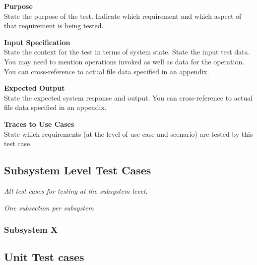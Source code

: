 \documentclass[12pt]{article}
\newcounter{req ID}
\begin{document}
\noindent
{\bf Purpose}\\
State the purpose of the test.
Indicate which requirement and which aspect of that requirement is being tested.

\noindent
{\bf Input Specification}\\
State the context for the test in terms of system state.
State the input test data. You may need to mention operations invoked as well as data for the operation.
You can cross-reference to actual file data specified in an appendix.

\noindent
{\bf Expected Output}\\
State the expected system response and output.
You can cross-reference to actual file data specified in an appendix.

\noindent
{\bf Traces to Use Cases}\\
State which requirements (at the level of use case and scenario) are tested by this test case.

\subsection{Subsystem Level Test Cases}

{\it
All test cases for testing at the subsystem level.
}

{\it
One subsection per subsystem
}

\subsubsection{Subsystem X}

\subsection{Unit Test cases}
\end{document}
